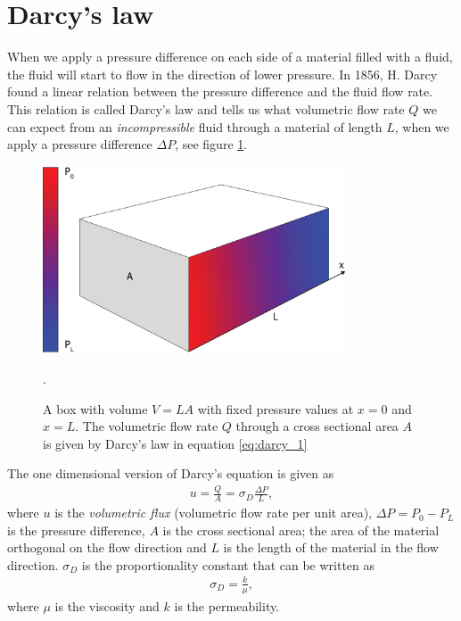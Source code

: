 \section{Darcy's law}
\label{sec:darcy_law}
When we apply a pressure difference on each side of a material filled with a fluid, the fluid will start to flow in the direction of lower pressure. In 1856, H. Darcy found a linear relation between the pressure difference and the fluid flow rate. This relation is called Darcy's law and tells us what volumetric flow rate $Q$ we can expect from an \textit{incompressible} fluid through a material of length $L$, when we apply a pressure difference $\Delta P$, see figure \ref{fig:darcys_law}. 
\begin{figure}[h]
\begin{center}
\includegraphics[width=0.8\textwidth, trim=0cm 0cm 0cm 0cm, clip]{kinetic_theory/figures/darcy.eps}
\end{center}
\caption{A box with volume $V=LA$ with fixed pressure values at $x=0$ and $x=L$. The volumetric flow rate $Q$ through a cross sectional area $A$ is given by Darcy's law in equation \eqref{eq:darcy_1}}.
\label{fig:darcys_law}
\end{figure}
The one dimensional version of Darcy's equation is given as 
\begin{align}
\label{eq:darcy_1}
	u = \frac{Q}{A} = \sigma_D\frac{\Delta P}{ L},
\end{align}
where $u$ is the \textit{volumetric flux} (volumetric flow rate per unit area), $\Delta P = P_0 - P_L$ is the pressure difference, $A$ is the cross sectional area; the area of the material orthogonal on the flow direction and $L$ is the length of the material in the flow direction. $\sigma_D$ is the proportionality constant that can be written as
\begin{align}
	\sigma_D = \frac{k}{\mu},
\end{align}
where $\mu$ is the viscosity and $k$ is the permeability.
